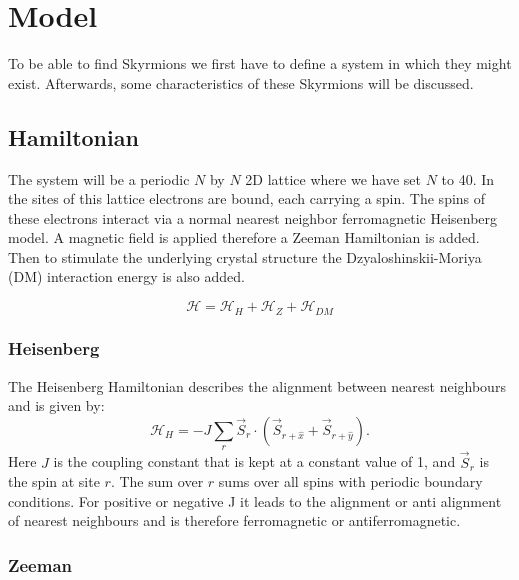 \section{Model}
\setlength{\abovedisplayskip}{0pt plus 1pt}%
\setlength{\belowdisplayskip}{0pt plus 1pt}%
\setlength{\abovedisplayshortskip}{0pt plus 1pt}%
\setlength{\belowdisplayshortskip}{0pt plus 1pt}%

To be able to find Skyrmions we first have to define a system in which they might exist. Afterwards,  some characteristics of these Skyrmions will be discussed. 

\subsection{Hamiltonian}

The system will be a periodic $N$ by $N$ 2D lattice where we have set $N$  to 40. In the sites of this lattice electrons are bound, each carrying a spin. The spins of these electrons interact via a normal nearest neighbor ferromagnetic Heisenberg model. A magnetic field is applied therefore a Zeeman Hamiltonian is added. Then to stimulate the underlying crystal structure the Dzyaloshinskii-Moriya (DM) interaction energy is also added.

\begin{equation}
	\mathcal{H} =\mathcal{H}_H + \mathcal{H}_{Z} +\mathcal{H}_{DM}
	\label{eq: H_tot}
\end{equation}


\subsubsection{Heisenberg}

The Heisenberg Hamiltonian describes the alignment between nearest neighbours and is given by: 
\begin{equation}
	\mathcal{H}_H = -J \sum_r \vec{S}_r \cdot \left( \vec{S}_{r + \hat{x}} + \vec{S}_{r + \hat{y}}  \right).
\end{equation}
Here $J$ is the coupling constant that is kept at a constant value of 1, and $\vec{S}_r$ is the spin at site $r$. The sum over $r$ sums over all spins with periodic boundary conditions. 
For positive or negative J it leads to the alignment or anti alignment of nearest neighbours and is therefore ferromagnetic or  antiferromagnetic.


\subsubsection{Zeeman}

